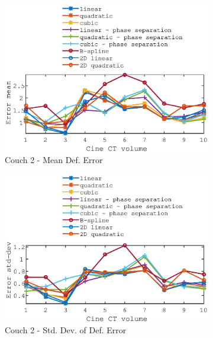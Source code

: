 \documentclass[11pt,a4paper,oneside]{report}
\begin{document}
\begin{figure}
\begin{subfigure}[b]{0.5\textwidth}
    \includegraphics[width=\textwidth, trim=0 0 0 \trimval,clip=true]{figures/task4/def_mean_error_couch2.eps}
    \caption{Couch 2 - Mean Def. Error}
  \end{subfigure}%
  \begin{subfigure}[b]{0.5\textwidth}
    \includegraphics[width=\textwidth, trim=0 0 0 \trimval,clip=true]{figures/task4/def_stddev_error_couch2.eps}
    \caption{Couch 2 - Std. Dev. of Def. Error}
  \end{subfigure}
  ~
    \hspace*{-2em}
  \begin{subfigure}[b]{0.5\textwidth}

\end{subfigure}
\end{figure}
\end{document}
